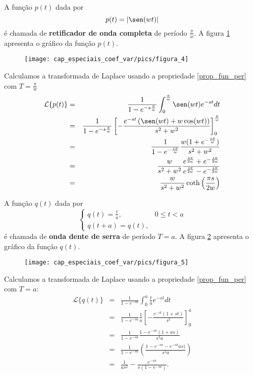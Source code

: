 \begin{ex} A função $p(t)$ dada por
\begin{equation}
p(t)=|\sen(wt)|
\end{equation}
é chamada de {\bf retificador de onda completa} de período $\frac{\pi}{w}$. A figura \ref{fig_ret_onda_completa} apresenta o gráfico da função $p(t)$.
 \begin{figure}[!ht]
\begin{center}

\texttt{[image: cap\_especiais\_coef\_var/pics/figura\_4]}\end{center}
\caption{\label{fig_ret_onda_completa}}
\end{figure}
Calculamos a transformada de Laplace usando a propriedade \ref{prop_fun_per} com $T=\frac{\pi}{w}$
\begin{eqnarray*}
\mathcal{L}\{p(t)\}&=& \frac{1}{1-e^{-s\frac{\pi}{w}}}\int_0^{\frac{\pi}{w}}\sen(wt)e^{-st}dt\\
&=& \frac{1}{1-e^{-s\frac{\pi}{w}}} \left[-\frac{e^{-st}\left(\sen(wt)+w\cos(wt)\right)}{s^2+w^2}\right]_0^{\frac{\pi}{w}}\\
&=& \frac{1}{1-e^{-\frac{s\pi}{w}}} \frac{w(1+e^{-\frac{s\pi}{w}})}{s^2+w^2}\\
&=&  \frac{w}{s^2+w^2}\frac{e^{\frac{s\pi}{2w}}+e^{-\frac{s\pi}{2w}}}{e^{\frac{s\pi}{2w}}-e^{-\frac{s\pi}{2w}}}\\
&=&  \frac{w}{s^2+w^2}\coth\left( \frac{\pi s}{2w}\right)
\end{eqnarray*}
\end{ex}
\begin{ex} A função $q(t)$ dada por
\begin{equation}
\left\{\begin{array}{ll}q(t)=\frac{t}{a},&0\leq t<a\\ q\left(t+a\right)=q(t), & \end{array}\right.
\end{equation}
é chamada de {\bf onda dente de serra} de período $T=a$. A figura \ref{fig_dente_de_serra} apresenta o gráfico da função $q(t)$.
 \begin{figure}[!ht]
\begin{center}

\texttt{[image: cap\_especiais\_coef\_var/pics/figura\_5]}\end{center}
\caption{\label{fig_dente_de_serra}}
\end{figure}
Calculamos a transformada de Laplace usando a propriedade \ref{prop_fun_per} com $T=a$:
\begin{eqnarray*}
\mathcal{L}\{q(t)\}&=& \frac{1}{1-e^{-sa}} \int_0^{a} \frac{t}{a} e^{-st}dt\\
&=&\frac{1}{1-e^{-sa}}\frac{1}{a}\left[ -\frac{e^{-s t} (1+s t)}{s^2}\right]_0^a\\
&=&\frac{1}{1-e^{-sa}}\frac{1-e^{-sa}(1+as)}{s^2a} \\
&=&\frac{1}{1-e^{-sa}}\left(\frac{1-e^{-sa}-e^{-sa} as)}{s^2a} \right)\\
&=&\frac{1}{as^2}-\frac{e^{-sa} }{s\left(1-e^{-sa}\right)}.
\end{eqnarray*}
\end{ex}

